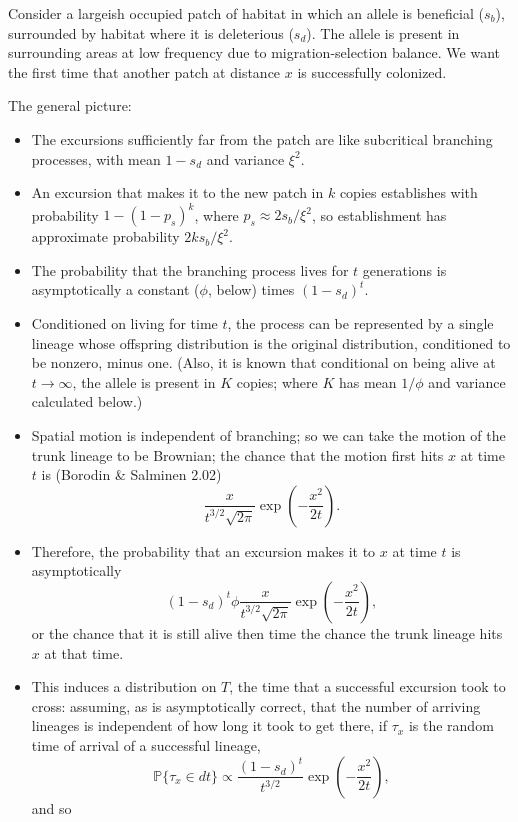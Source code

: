 \documentclass{article}
\renewcommand{\P}{\mathbb{P}}
\begin{document}
Consider a largeish occupied patch of habitat in which an allele is beneficial ($s_b$),
surrounded by habitat where it is deleterious ($s_d$).
The allele is present in surrounding areas at low frequency due to migration-selection balance.
We want the first time that another patch at distance $x$ is successfully colonized.

The general picture:
\begin{itemize}

\item The excursions sufficiently far from the patch are like subcritical branching processes,
with mean $1-s_d$ and variance $\xi^2$.

\item An excursion that makes it to the new patch in $k$ copies establishes with probability $1-(1-p_s)^k$,
where $p_s \approx 2s_b/\xi^2$, so establishment has approximate probability $2 k s_b / \xi^2$.

\item The probability that the branching process lives for $t$ generations is asymptotically a constant ($\phi$, below) times $(1-s_d)^t$.

\item Conditioned on living for time $t$, the process can be represented by a single lineage whose offspring distribution
is the original distribution, conditioned to be nonzero, minus one.
(Also, it is known that conditional on being alive at $t\to\infty$, the allele is present in $K$ copies; where $K$ has mean $1/\phi$ and variance calculated below.)

\item Spatial motion is independent of branching;
so we can take the motion of the trunk lineage to be Brownian;
the chance that the motion first hits $x$ at time $t$ is (Borodin \& Salminen 2.02)
\[
\frac{x}{t^{3/2}\sqrt{2\pi}} \exp\left(-\frac{x^2}{2t}\right) .
\]

\item Therefore, the probability that an excursion makes it to $x$ at time $t$ is asymptotically
\[
  (1-s_d)^t \phi \frac{x}{t^{3/2}\sqrt{2\pi}} \exp\left(-\frac{x^2}{2t}\right) ,
\]
or the chance that it is still alive then time the chance the trunk lineage hits $x$ at that time.

\item This induces a distribution on $T$, the time that a successful excursion took to cross:
assuming, as is asymptotically correct, that the number of arriving lineages is independent of how long it took to get there,
if $\tau_x$ is the random time of arrival of a successful lineage,
\[
 \P\{\tau_x \in dt\} \propto \frac{(1-s_d)^t}{t^{3/2}} \exp\left(-\frac{x^2}{2t}\right) ,
\]
and so


\end{itemize}
\end{document}
